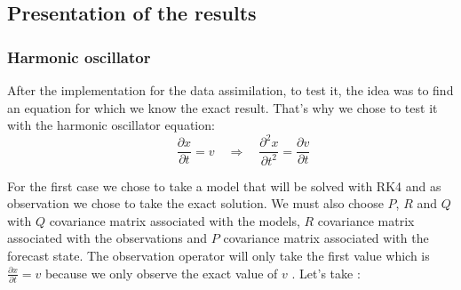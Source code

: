 \subsection{Presentation of the results}
\subsubsection{Harmonic oscillator}
\noindent After the implementation for the data assimilation, to test it, the idea was to find an equation for which we know the exact result. That's why we chose to test it with the harmonic oscillator equation:
$$\qquad \frac{\partial x}{\partial t}=v \quad \Rightarrow \quad \frac{\partial^2 x}{\partial t^2}=\frac{\partial v}{\partial t}$$



For the first case we chose to take a model that will be solved with RK4 and as observation we chose to take the exact solution. We must also choose $P$, $R$ and $Q$ with $Q$ covariance matrix associated with the models, $R$ covariance matrix associated with the observations and $P$ covariance matrix associated with the forecast state.
The observation operator will only take the first value which is $\frac{\partial x}{\partial t}=v$ because we only observe the exact value of $v$ .
Let's take :

